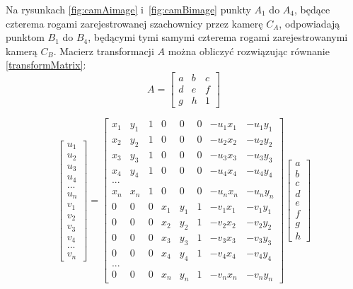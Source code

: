 Na rysunkach \ref{fig:camAimage} i~\ref{fig:camBimage} punkty $A_1$ do $A_4$, będące czterema rogami zarejestrowanej szachownicy przez kamerę $C_A$, odpowiadają punktom $B_1$ do $B_4$, będącymi tymi samymi czterema rogami zarejestrowanymi kamerą $C_B$. Macierz transformacji $A$ można obliczyć rozwiązując równanie \eqref{transformMatrix}:
\begin{equation}
\label{transformMatrix}
A = \begin{bmatrix}
a & b & c\\ 
d & e & f\\ 
g & h & 1
\end{bmatrix}
\end{equation}

\begin{equation}
\begin{bmatrix}
u_1\\ 
u_2\\ 
u_3\\ 
u_4\\
...\\ 
u_n\\ 
v_1\\ 
v_2\\ 
v_3\\ 
v_4\\ 
...\\ 
v_n 

\end{bmatrix}
=
\begin{bmatrix}
x_1 & y_1 & 1 & 0 & 0 & 0 & -u_1x_1 & -u_1y_1\\ 
x_2 & y_2 & 1 & 0 & 0 & 0 & -u_2x_2 & -u_2y_2\\ 
x_3 & y_3 & 1 & 0 & 0 & 0 & -u_3x_3 & -u_3y_3\\ 
x_4 & y_4 & 1 & 0 & 0 & 0 & -u_4x_4 & -u_4y_4\\ 
...\\ 
x_n & x_n & 1 & 0 & 0 & 0 & -u_nx_n & -u_ny_n\\ 
0 & 0 & 0 & x_1 & y_1 & 1 & -v_1x_1 & -v_1y_1\\ 
0 & 0 & 0 & x_2 & y_2 & 1 & -v_2x_2 & -v_2y_2\\  
0 & 0 & 0 & x_3 & y_3 & 1 & -v_3x_3 & -v_3y_3\\ 
0 & 0 & 0 & x_4 & y_4 & 1 & -v_4x_4 & -v_4y_4\\ 
...\\ 
0 & 0 & 0 & x_n & y_n & 1 & -v_nx_n & -v_ny_n
\end{bmatrix}
\begin{bmatrix}
a \\
b\\
c\\
d \\
e\\
f\\
g\\
h
\end{bmatrix}
\end{equation}

